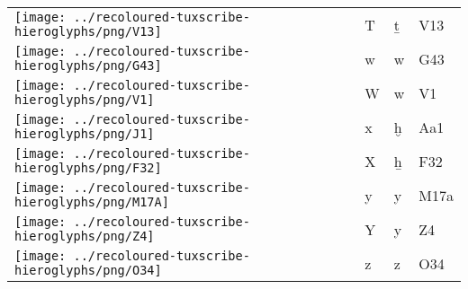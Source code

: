 \begin{center}
\begin{tabularx}{\linewidth}{YYYY}
\vspace{0.37500cm} \texttt{[image: ../recoloured-tuxscribe-hieroglyphs/png/V13]} \vspace{0.37500cm} & T & ṯ & V13 \\ 
\texttt{[image: ../recoloured-tuxscribe-hieroglyphs/png/G43]} & w & w & G43 \\ 
\texttt{[image: ../recoloured-tuxscribe-hieroglyphs/png/V1]} & W & w & V1 \\ 
\texttt{[image: ../recoloured-tuxscribe-hieroglyphs/png/J1]} & x & ḫ & Aa1 \\ 
\vspace{0.32500cm} \texttt{[image: ../recoloured-tuxscribe-hieroglyphs/png/F32]} \vspace{0.32500cm} & X & ẖ & F32 \\ 
\texttt{[image: ../recoloured-tuxscribe-hieroglyphs/png/M17A]} & y & y & M17a \\ 
\texttt{[image: ../recoloured-tuxscribe-hieroglyphs/png/Z4]} & Y & y & Z4 \\ 
\vspace{0.32500cm} \texttt{[image: ../recoloured-tuxscribe-hieroglyphs/png/O34]} \vspace{0.32500cm} & z & z & O34 \\ 
\end{tabularx}
\end{center}
